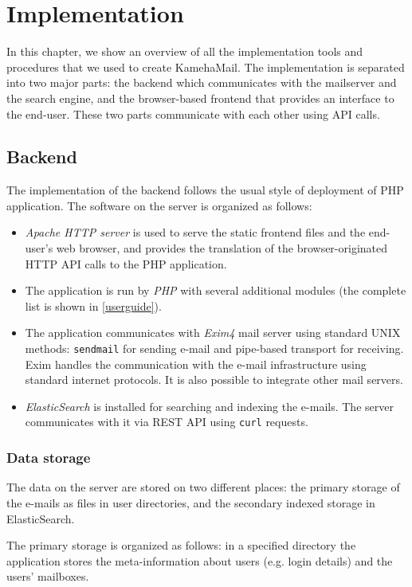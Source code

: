 \chapter{Implementation}
\label{implementation}
In this chapter, we show an overview of all the implementation tools and procedures that we used to create KamehaMail. The implementation is separated into two major parts: the backend which communicates with the mailserver and the search engine, and the browser-based frontend that provides an interface to the end-user. These two parts communicate with each other using API calls.

\section{Backend}
 The implementation of the backend follows the usual style of deployment of PHP application. The software on the server is organized as follows:
\begin{itemize}
\item \emph{Apache HTTP server} is used to serve the static frontend files and the end-user's web browser, and provides the translation of the browser-originated HTTP API calls to the PHP application.
\item The application is run by \emph{PHP} with several additional modules (the complete list is shown in \autoref{userguide}).
\item The application communicates with \emph{Exim4} mail server using standard UNIX methods: \texttt{sendmail} for sending e-mail and pipe-based transport for receiving. Exim handles the communication with the e-mail infrastructure using standard internet protocols. It is also possible to integrate other mail servers.
\item \emph{ElasticSearch} is installed for searching and indexing the e-mails. The server communicates with it via REST API using \texttt{curl} requests.
\end{itemize}

\subsection{Data storage}
The data on the server are stored on two different places: the primary storage of the e-mails as files in user directories, and the secondary indexed storage in ElasticSearch.

The primary storage is organized as follows: in a specified directory 
the application stores the meta-information about users
(e.g. login details) and the users' mailboxes.

